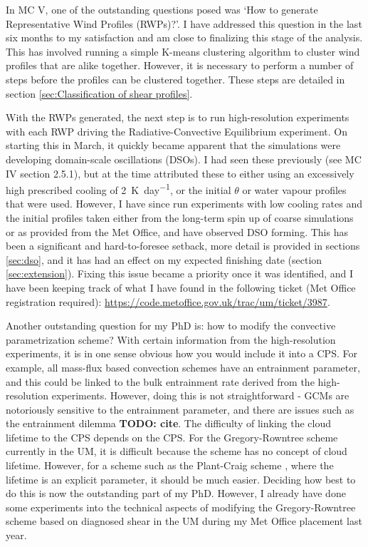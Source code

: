 \documentclass[11pt,a4paper]{article}
\newcommand\todo[1]{\textbf{TODO: #1}}
\begin{document}
In MC V, one of the outstanding questions posed was `How to generate Representative Wind Profiles (RWPs)?'. I have addressed this question in the last six months to my satisfaction and am close to finalizing this stage of the analysis. This has involved running a simple K-means clustering algorithm to cluster wind profiles that are alike together. However, it is necessary to perform a number of steps before the profiles can be clustered together. These steps are detailed in section \ref{sec:Classification of shear profiles}.

With the RWPs generated, the next step is to run high-resolution experiments with each RWP driving the Radiative-Convective Equilibrium experiment. On starting this in March, it quickly became apparent that the simulations were developing domain-scale oscillations (DSOs). I had seen these previously (see MC IV section 2.5.1), but at the time attributed these to either using an excessively high prescribed cooling of \SI{2}{K.day^{-1}}, or the initial $\theta$ or water vapour profiles that were used. However, I have since run experiments with low cooling rates and the initial profiles taken either from the long-term spin up of coarse simulations or as provided from the Met Office, and have observed DSO forming. This has been a significant and hard-to-foresee setback, more detail is provided in sections \ref{sec:dso}, and it has had an effect on my expected finishing date (section \ref{sec:extension}). Fixing this issue became a priority once it was identified, and I have been keeping track of what I have found in the following ticket (Met Office registration required): \url{https://code.metoffice.gov.uk/trac/um/ticket/3987}.

Another outstanding question for my PhD is: how to modify the convective parametrization scheme? With certain information from the high-resolution experiments, it is in one sense obvious how you would include it into a CPS. For example, all mass-flux based convection schemes have an entrainment parameter, and this could be linked to the bulk entrainment rate derived from the high-resolution experiments. However, doing this is not straightforward - GCMs are notoriously sensitive to the entrainment parameter, and there are issues such as the entrainment dilemma \todo{cite}. The difficulty of linking the cloud lifetime to the CPS depends on the CPS. For the Gregory-Rowntree scheme \parencite{gregory1990mass} currently in the UM, it is difficult because the scheme has no concept of cloud lifetime. However, for a scheme such as the Plant-Craig scheme \parencite{plant2008stochastic}, where the lifetime is an explicit parameter, it should be much easier. Deciding how best to do this is now the outstanding part of my PhD. However, I already have done some experiments into the technical aspects of modifying the Gregory-Rowntree scheme based on diagnosed shear in the UM during my Met Office placement last year.
\end{document}
